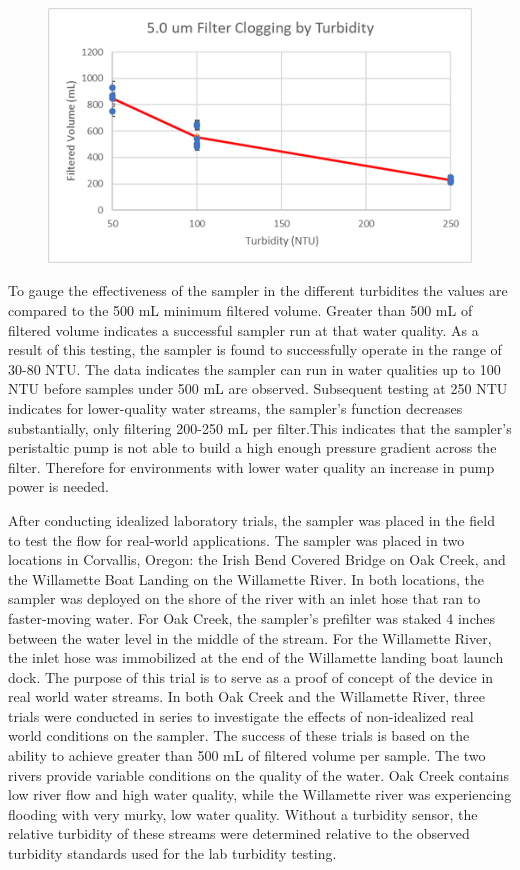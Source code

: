 \documentclass[11pt, letterpaper]{article}
\begin{document}
\begin{figure}[H]
	\centering
	\includegraphics[scale=1]{./Assets/Turbidity.png}
	\caption{}
\end{figure}
\par\noindent
To gauge the effectiveness of the sampler in the different turbidites the values are compared to the 500 mL minimum filtered volume. Greater than 500 mL of filtered volume indicates a successful sampler run at that water quality. As a result of this testing, the sampler is found to successfully operate in the range of 30-80 NTU. The data indicates the sampler can run in water qualities up to 100 NTU before samples under 500 mL are observed. Subsequent testing at 250 NTU indicates for lower-quality water streams, the sampler’s function decreases substantially, only filtering 200-250 mL per filter.This indicates that the sampler’s peristaltic pump is not able to build a high enough pressure gradient across the filter. Therefore for environments with lower water quality an increase in pump power is needed.
\newline\par
After conducting idealized laboratory trials, the sampler was placed in the field to test the flow for real-world applications. The sampler was placed in two locations in Corvallis, Oregon: the Irish Bend Covered Bridge on Oak Creek, and the Willamette Boat Landing on the Willamette River. In both locations, the sampler was deployed on the shore of the river with an inlet hose that ran to faster-moving water. For Oak Creek, the sampler’s prefilter was staked 4 inches between the water level in the middle of the stream. For the Willamette River, the inlet hose was immobilized at the end of the Willamette landing boat launch dock. The purpose of this trial is to serve as a proof of concept of the device in real world water streams. In both Oak Creek and the Willamette River, three trials were conducted in series to investigate the effects of non-idealized real world conditions on the sampler. The success of these trials is based on the ability to achieve greater than 500 mL of filtered volume per sample. The two rivers provide variable conditions on the quality of the water. Oak Creek contains low river flow and high water quality, while the Willamette river was experiencing flooding with very murky, low water quality. Without a turbidity sensor, the relative turbidity of these streams were determined relative to the observed turbidity standards used for the lab turbidity testing.
\end{document}
